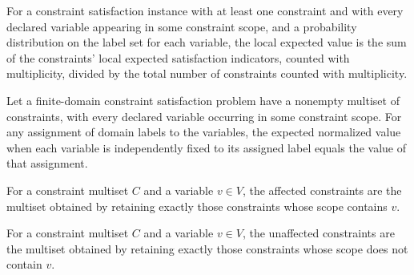 \begin{definition}
\label{FABL.CSPInstance.localExpectedValue}
\leanok
{}
For a constraint satisfaction instance with at least one constraint and with every
declared variable appearing in some constraint scope, and a probability distribution on
the label set for each variable, the local expected value is the sum of the constraints’
local expected satisfaction indicators, counted with multiplicity, divided by the total
number of constraints counted with multiplicity.
\end{definition}

\begin{theorem}
\label{FABL.CSPInstance.localExpectedValue_pure}
\leanok
{}
Let a finite-domain constraint satisfaction problem have a nonempty multiset of
constraints, with every declared variable occurring in some constraint scope. For any
assignment of domain labels to the variables, the expected normalized value when each
variable is independently fixed to its assigned label equals the value of that
assignment.
\end{theorem}

\begin{definition}
\label{FABL.CSPInstance.affectedConstraints}
\leanok
{}
For a constraint multiset $C$ and a variable $v\in V$, the affected constraints are the
multiset obtained by retaining exactly those constraints whose scope contains $v$.
\end{definition}

\begin{definition}
\label{FABL.CSPInstance.unaffectedConstraints}
\leanok
{}
For a constraint multiset $C$ and a variable $v\in V$, the unaffected constraints are
the multiset obtained by retaining exactly those constraints whose scope does not
contain $v$.
\end{definition}

